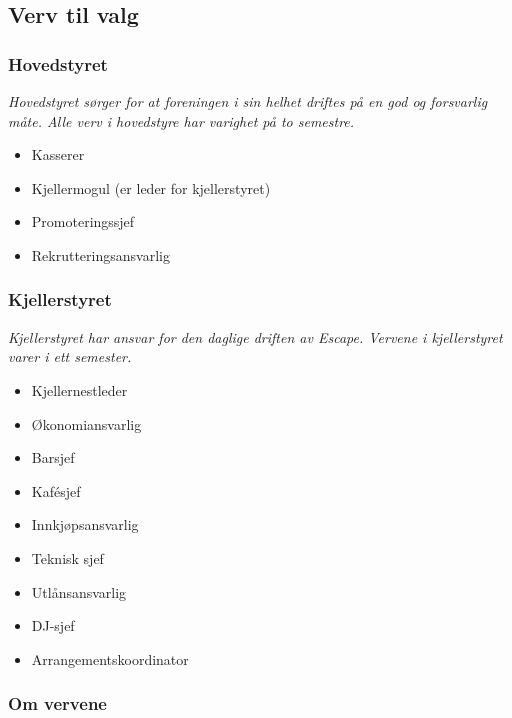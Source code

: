 \documentclass[12pt, norsk, a4paper]{proc}
\providecommand{\tightlist}{%
  \setlength{\itemsep}{0pt}\setlength{\parskip}{0pt}}
\begin{document}
\hypertarget{verv-til-valg}{%
\subsection*{Verv til valg}\label{verv-til-valg}}

\hypertarget{hovedstyret}{%
\subsubsection*{Hovedstyret}\label{hovedstyret}}

\emph{Hovedstyret sørger for at foreningen i sin helhet driftes på en
god og forsvarlig måte. Alle verv i hovedstyre har varighet på to
semestre.}

\begin{itemize}
\tightlist
\item
  Kasserer
\item
  Kjellermogul (er leder for kjellerstyret)
\item
  Promoteringssjef
\item
  Rekrutteringsansvarlig
\end{itemize}

\hypertarget{kjellerstyret}{%
\subsubsection*{Kjellerstyret}\label{kjellerstyret}}

\emph{Kjellerstyret har ansvar for den daglige driften av Escape.
Vervene i kjellerstyret varer i ett semester.}

\begin{itemize}
\tightlist
\item
  Kjellernestleder
\item
  Økonomiansvarlig
\item
  Barsjef
\item
  Kafésjef
\item
  Innkjøpsansvarlig
\item
  Teknisk sjef
\item
  Utlånsansvarlig
\item
  DJ-sjef
\item
  Arrangementskoordinator
\end{itemize}

\hypertarget{om-vervene}{%
\subsubsection*{Om vervene}\label{om-vervene}}
\end{document}
